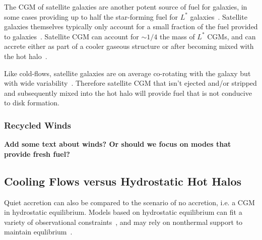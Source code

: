 \documentclass[fleqn,usenatbib]{mnras}
\begin{document}
The CGM of satellite galaxies are another potent source of fuel for galaxies, in some cases providing up to half the star-forming fuel for $L^*$ galaxies~\citep[intergalactic transfer; ][]{Angles-Alcazar2017}.
Satellite galaxies themselves typically only account for a small fraction of the fuel provided to galaxies~\citep{Angles-Alcazar2017}. 
Satellite CGM can account for $\sim1/4$ the mass of $L^*$ CGMs, and can accrete either as part of a cooler gaseous structure or after becoming mixed with the hot halo~\citep{Hafen2019, Hafen2020}.

Like cold-flows, satellite galaxies are on average co-rotating with the galaxy but with wide variability~\citep[e.g.][]{Stewart2011, Hafen2019}.
Therefore satellite CGM that isn't ejected and/or stripped and subsequently mixed into the hot halo will provide fuel that is not conducive to disk formation.

\subsubsection{Recycled Winds}
\label{s: modes -- winds}

\textbf{
Add some text about winds?
Or should we focus on modes that provide fresh fuel?
}


\subsection{Cooling Flows versus Hydrostatic Hot Halos}
\label{s: modes -- hydrostatic}

Quiet accretion can also be compared to the scenario of no accretion, i.e. a CGM in hydrostatic equilibrium.
Models based on hydrostatic equilibrium can fit a variety of observational constraints~\citep[e.g.][]{Faerman2017, Krause2019}, and may rely on nonthermal support to maintain equlibrium~\citep[e.g.][]{Faerman2019}.
\end{document}
